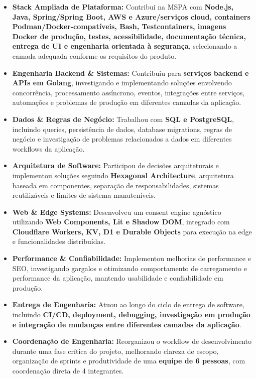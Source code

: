 \documentclass[10pt,a4paper]{article}
\begin{document}
\begin{itemize}
    \item
    \textbf{Stack Ampliada de Plataforma:}
    Contribui na MSPA com \textbf{Node.js, Java, Spring/Spring Boot,
    AWS e Azure/serviços cloud, containers Podman/Docker-compatíveis,
    Bash, Testcontainers, imagens Docker de produção, testes, acessibilidade,
    documentação técnica, entrega de UI e engenharia orientada à segurança},
    selecionando a camada adequada conforme os requisitos do produto.

    \item
    \textbf{Engenharia Backend \& Sistemas:}
    Contribuiu para \textbf{serviços backend e APIs em Golang},
    investigando e implementando soluções envolvendo
    concorrência, processamento assíncrono, eventos, integrações
    entre serviços, automações e problemas de produção em
    diferentes camadas da aplicação.

    \item
    \textbf{Dados \& Regras de Negócio:}
    Trabalhou com \textbf{SQL e PostgreSQL}, incluindo queries,
    persistência de dados, database migrations, regras de negócio
    e investigação de problemas relacionados a dados em
    diferentes workflows da aplicação.

    \item
    \textbf{Arquitetura de Software:}
    Participou de decisões arquiteturais e implementou soluções
    seguindo \textbf{Hexagonal Architecture}, arquitetura baseada
    em componentes, separação de responsabilidades, sistemas
    reutilizáveis e limites de sistema manuteníveis.

    \item
    \textbf{Web \& Edge Systems:}
    Desenvolveu um consent engine agnóstico utilizando
    \textbf{Web Components, Lit e Shadow DOM}, integrado com
    \textbf{Cloudflare Workers, KV, D1 e Durable Objects}
    para execução na edge e funcionalidades distribuídas.

    \item
    \textbf{Performance \& Confiabilidade:}
    Implementou melhorias de performance e SEO, investigando
    gargalos e otimizando comportamento de carregamento e
    performance da aplicação, mantendo usabilidade e
    confiabilidade em produção.

    \item
    \textbf{Entrega de Engenharia:}
    Atuou ao longo do ciclo de entrega de software, incluindo
    \textbf{CI/CD, deployment, debugging, investigação em
    produção e integração de mudanças entre diferentes camadas
    da aplicação}.

    \item
    \textbf{Coordenação de Engenharia:}
    Reorganizou o workflow de desenvolvimento durante uma fase
    crítica do projeto, melhorando clareza de escopo, organização
    de sprints e produtividade de uma \textbf{equipe de 6 pessoas},
    com coordenação direta de 4 integrantes.

\end{itemize}
\end{document}
